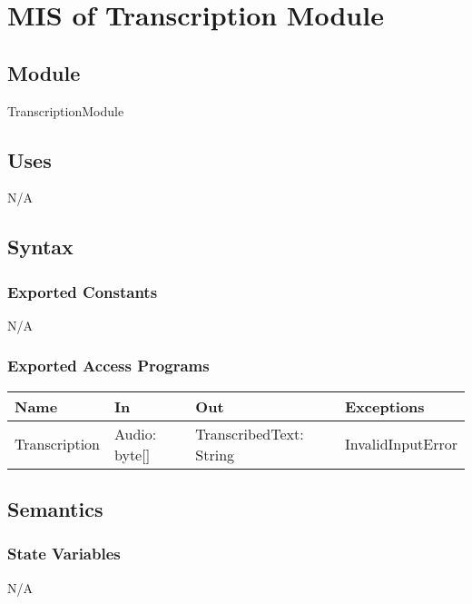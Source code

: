 \documentclass[12pt, titlepage]{article}
\begin{document}
\newpage

  
\section{MIS of Transcription Module} \label{Transcription_Module}

\subsection{Module}
TranscriptionModule

\subsection{Uses}

N/A

\subsection{Syntax}

\subsubsection{Exported Constants}

N/A

\subsubsection{Exported Access Programs}

\begin{center}
\begin{tabular}{p{2cm} p{4cm} p{4cm} p{2cm}}
\hline
\textbf{Name} & \textbf{In} & \textbf{Out} & \textbf{Exceptions} \\
\hline
Transcription & Audio: byte[] & TranscribedText: String & InvalidInputError \\ 
\hline
\end{tabular}
\end{center}

\subsection{Semantics}

\subsubsection{State Variables}

N/A
\end{document}
